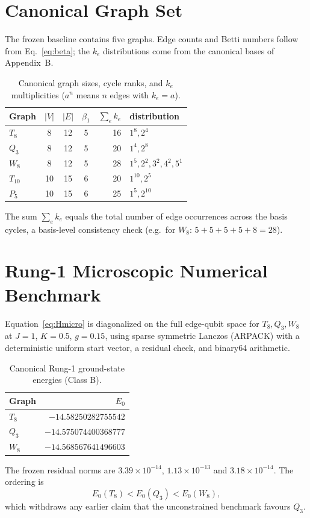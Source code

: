 \documentclass[10pt,twocolumn]{article}
\theoremstyle{definition}
\begin{document}
\section{Canonical Graph Set}
The frozen baseline contains five graphs. Edge counts and Betti numbers follow from Eq.~\eqref{eq:beta}; the $k_e$ distributions come from the canonical bases of Appendix~B.

\begin{table}[h]
\centering\small
\caption{Canonical graph sizes, cycle ranks, and $k_e$ multiplicities ($a^{n}$ means $n$ edges with $k_e=a$).}
\label{tab:graphs}
\begin{tabular}{@{}lcccrl@{}}
\toprule
Graph&$|V|$&$|E|$&$\beta_1$&$\sum_ek_e$&distribution\\\midrule
$T_8$&8&12&5&16&$1^8,2^4$\\
$Q_3$&8&12&5&20&$1^4,2^8$\\
$W_8$&8&12&5&28&$1^5,2^2,3^2,4^2,5^1$\\
$T_{10}$&10&15&6&20&$1^{10},2^5$\\
$P_5$&10&15&6&25&$1^5,2^{10}$\\\bottomrule
\end{tabular}
\end{table}
The sum $\sum_ek_e$ equals the total number of edge occurrences across the basis cycles, a basis-level consistency check (e.g.\ for $W_8$: $5+5+5+5+8=28$).

\section{Rung-1 Microscopic Numerical Benchmark}\label{sec:rung1}
Equation~\eqref{eq:Hmicro} is diagonalized on the full edge-qubit space for $T_8,Q_3,W_8$ at $J=1$, $K=0.5$, $g=0.15$, using sparse symmetric Lanczos (ARPACK) with a deterministic uniform start vector, a residual check, and binary64 arithmetic.

\begin{table}[h]
\centering\small
\caption{Canonical Rung-1 ground-state energies (Class B).}
\begin{tabular}{@{}lr@{}}
\toprule Graph&$E_0$\\\midrule
$T_8$&$-14.58250282755542$\\
$Q_3$&$-14.575074400368777$\\
$W_8$&$-14.568567641496603$\\\bottomrule
\end{tabular}
\end{table}
The frozen residual norms are $3.39\times10^{-14}$, $1.13\times10^{-13}$ and $3.18\times10^{-14}$. The ordering is
\begin{equation}
E_0(T_8)<E_0(Q_3)<E_0(W_8), \label{eq:order}
\end{equation}
which withdraws any earlier claim that the unconstrained benchmark favours $Q_3$.
\end{document}
